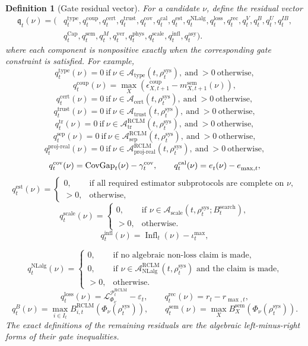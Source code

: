 \documentclass[11pt,a4paper]{article}
\newtheorem{definition}[theorem]{Definition}
\newcommand{\Lcal}{\mathcal L}
\newcommand{\Pcal}{\mathcal P}
\newcommand{\Acal}{\mathcal A}
\newcommand{\calib}{\mathrm{cal}}
\newcommand{\eps}{\varepsilon}
\newcommand{\RCLM}{\mathrm{RCLM}}
\newcommand{\sem}{\mathrm{sem}}
\newcommand{\sys}{\mathrm{sys}}
\newcommand{\rec}{\mathrm{rec}}
\newcommand{\loss}{\mathrm{loss}}
\providecommand{\Cap}{\operatorname{Cap}}
\newcommand{\ver}{\mathrm{ver}}
\newcommand{\phys}{\mathrm{phys}}
\newcommand{\asy}{\mathrm{asy}}
\newcommand{\search}{\mathrm{search}}
\newcommand{\cert}{\mathrm{cert}}
\newcommand{\coup}{\mathrm{coup}}
\newcommand{\trust}{\mathrm{trust}}
\newcommand{\scale}{\mathrm{scale}}
\newcommand{\infl}{\mathrm{infl}}
\newcommand{\cov}{\mathrm{cov}}
\newcommand{\est}{\mathrm{est}}
\newcommand{\NLalg}{\mathrm{NLalg}}
\begin{document}
\begin{definition}[Gate residual vector]
For a candidate \(\nu\), define the residual vector
\[
\begin{aligned}
\mathfrak q_t(\nu)=\bigl(&
q_t^{\mathrm{type}},q_t^{\coup},q_t^{\cert},q_t^{\trust},q_t^{\cov},q_t^{\calib},q_t^{\est},
q_t^{\NLalg},q_t^{\loss},q_t^{\rec},q_t^{V},q_t^{B},q_t^{U},q_t^{IB},\\
&
q_t^{\Cap},q_t^{\sem},q_t^M,q_t^{\ver},q_t^{\phys},
q_t^{\scale},q_t^{\infl},q_t^{\asy}
\bigr).
\end{aligned}
\]
where each component is nonpositive exactly when the corresponding gate constraint is satisfied.  For example,
\[
q_t^{\mathrm{type}}(\nu)=0\ \text{if}\ \nu\in\Acal_{\mathrm{type}}(t,\rho_t^{\sys}),\ \text{and}\ >0\ \text{otherwise},
\]
\[
q_t^{\coup}(\nu)=\max_X(\epsilon_{X,t+1}^{\coup}-m_{X,t+1}^{\sem}(\nu)),
\]
\[
q_t^{\cert}(\nu)=0\ \text{if}\ \nu\in\Acal_{\cert}(t,\rho_t^{\sys}),\ \text{and}\ >0\ \text{otherwise},
\]
\[
q_t^{\trust}(\nu)=0\ \text{if}\ \nu\in\Acal_{\trust}(t,\rho_t^{\sys}),\ \text{and}\ >0\ \text{otherwise},
\]
\[
q_t^{\mathrm{tr}}(\nu)=0\ \text{if}\ \nu\in\Acal_{\mathrm{tr}}^{\RCLM}(t,\rho_t^{\sys}),\ \text{and}\ >0\ \text{otherwise},
\]
\[
q_t^{\mathrm{sep}}(\nu)=0\ \text{if}\ \nu\in\Acal_{\mathrm{sep}}^{\RCLM}(t,\rho_t^{\sys}),\ \text{and}\ >0\ \text{otherwise},
\]
\[
q_t^{\mathrm{proj\mbox{-}real}}(\nu)=0\ \text{if}\ \nu\in\Acal_{\mathrm{proj\mbox{-}real}}^{\RCLM}(t,\rho_t^{\sys}),\ \text{and}\ >0\ \text{otherwise},
\]
\[
q_t^{\cov}(\nu)=\operatorname{CovGap}_t(\nu)-\gamma_t^{\cov},
\qquad
q_t^{\calib}(\nu)=e_t^{\cal}(\nu)-e_{\max,t}^{\cal},
\]
\[
q_t^{\est}(\nu)=
\begin{cases}
0, & \text{if all required estimator subprotocols are complete on }\nu,\\
>0, & \text{otherwise,}
\end{cases}
\]
\[
q_t^{\scale}(\nu)=
\begin{cases}
0, & \text{if }\nu\in\Acal_{\scale}(t,\rho_t^{\sys};B_t^{\search}),\\
>0, & \text{otherwise.}
\end{cases}
\]
\[
q_t^{\infl}(\nu)=\operatorname{Infl}_t(\nu)-\iota_t^{\max},
\]

\[
q_t^{\NLalg}(\nu)=
\begin{cases}
0, & \text{if no algebraic non-loss claim is made,}\\
0, & \text{if }\nu\in\Acal_{\NLalg}^{\RCLM}(t,\rho_t^{\sys})\text{ and the claim is made,}\\
>0, & \text{otherwise.}
\end{cases}
\]
\[
q_t^{\loss}(\nu)=\Lcal^{\Pcal_t^{\RCLM}}_{\Phi_\nu}-\eps_t,
\qquad
q_t^{\rec}(\nu)=r_t-r_{\max,t},
\]
\[
q_t^{B}(\nu)=\max_{i\in I_t}B_{i,t}^{\RCLM}(\Phi_\nu(\rho_t^{\sys})),
\qquad
q_t^{\sem}(\nu)=\max_X B_X^{\sem}(\Phi_\nu(\rho_t^{\sys})).
\]
The exact definitions of the remaining residuals are the algebraic left-minus-right forms of their gate inequalities.
\end{definition}
\end{document}
